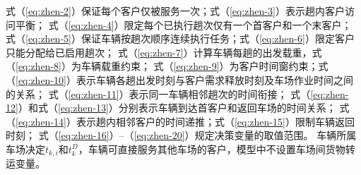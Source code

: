 式（\ref{eq:zhen-2}）保证每个客户仅被服务一次；式（\ref{eq:zhen-3}）表示趟内客户访问平衡；
式（\ref{eq:zhen-4}）限定每个已执行趟次仅有一个首客户和一个末客户；
式（\ref{eq:zhen-5}）保证车辆按趟次顺序连续执行任务；式（\ref{eq:zhen-6}）限定客户只能分配给已启用趟次；
式（\ref{eq:zhen-7}）计算车辆每趟的出发载重，式（\ref{eq:zhen-8}）为车辆载重约束；
式（\ref{eq:zhen-9}）为客户时间窗约束；式（\ref{eq:zhen-10}）表示车辆各趟出发时刻与客户需求释放时刻及车场作业时间之间的关系；
式（\ref{eq:zhen-11}）表示同一车辆相邻趟次的时间衔接；
式（\ref{eq:zhen-12}）和式（\ref{eq:zhen-13}）分别表示车辆到达首客户和返回车场的时间关系；
式（\ref{eq:zhen-14}）表示趟内相邻客户的时间递推；式（\ref{eq:zhen-15}）限制车辆返回时刻；
式（\ref{eq:zhen-16}）--（\ref{eq:zhen-20}）规定决策变量的取值范围。
车辆所属车场决定$t_{k,i}$和$t_k^D$，车辆可直接服务其他车场的客户，模型中不设置车场间货物转运变量。

